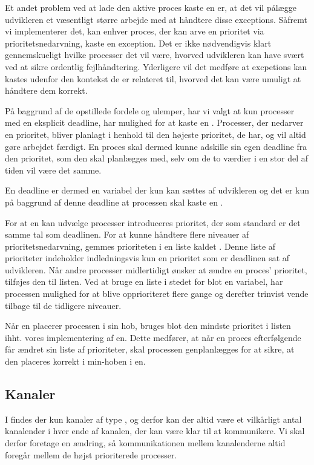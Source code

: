 Et andet problem ved at lade den aktive proces kaste en  er, at det vil pålægge udvikleren et væsentligt større arbejde med at håndtere disse exceptions. Såfremt vi implementerer det, kan enhver proces, der kan arve en prioritet via prioritetsnedarvning, kaste en exception. Det er ikke nødvendigvis klart gennemskueligt hvilke processer det vil være, hvorved udvikleren kan have svært ved at sikre ordentlig fejlhåndtering. Yderligere vil det medføre at excpetions kan kastes udenfor den kontekst de er relateret til, hvorved det kan være umuligt at håndtere dem korrekt.  

På baggrund af de opstillede fordele og ulemper, har vi valgt at kun processer med en eksplicit deadline, har mulighed for at kaste en . Processer, der nedarver en prioritet, bliver planlagt i henhold til den højeste prioritet, de har, og vil altid  gøre arbejdet færdigt. En proces skal dermed kunne adskille sin egen deadline fra den prioritet, som den skal planlægges med, selv om de to værdier i en stor del af tiden vil være det samme.

En deadline er dermed en variabel der kun kan sættes af udvikleren og det er kun på baggrund af denne deadline at  processen skal kaste en .

For at  \sched en kan udvælge processer introduceres prioritet, der som standard er det samme tal som deadlinen. For at kunne håndtere flere niveauer af prioritetsnedarvning,  gemmes prioriteten i en  liste kaldet . Denne liste af prioriteter  indeholder indledningsvis kun en prioritet som er deadlinen sat af udvikleren. Når andre processer  midlertidigt ønsker at ændre en proces' prioritet, tilføjes den til listen. Ved at bruge en liste i stedet for blot en variabel, har processen mulighed for at blive opprioriteret flere gange og derefter trinvist vende tilbage til de tidligere niveauer.

Når \sched en placerer processen i sin hob, bruges blot den mindste prioritet i listen ihht. vores implementering af \sched en. Dette medfører, at når en proces efterfølgende  får ændret sin liste af prioriteter, skal processen genplanlægges for at sikre, at den placeres korrekt i min-hoben i \sched en. 

\subsection{Kanaler}
I \pycsp findes der kun kanaler af type , og derfor kan der altid  være et vilkårligt antal kanalender i hver ende af kanalen, der kan være klar til at kommunikere. Vi skal derfor foretage en ændring, så kommunikationen mellem kanalenderne altid foregår mellem de højst prioriterede processer. 

